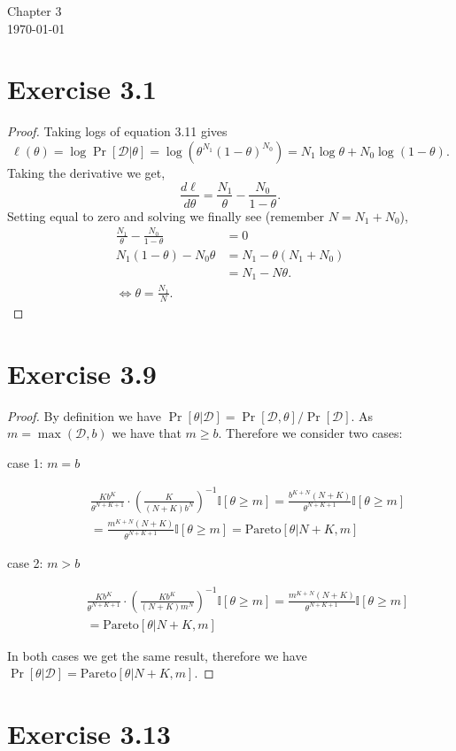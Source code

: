 \documentclass[12pt]{article}
\newcommand{\I}{\mathbb{I}}
\newcommand{\D}{\mathcal{D}}
\begin{document}
\begin{center}
{\Large Chapter 3}\\
\today
\end{center}
\section*{Exercise 3.1}
\begin{proof}
Taking logs of equation 3.11 gives
\[\ell(\theta) = \log \Pr[\D|\theta] = \log\left(\theta^{N_1}(1 - \theta)^{N_0} \right) = N_1 \log \theta + N_0 \log (1 - \theta).\] 
Taking the derivative we get,
\[\frac{d \ell}{d \theta} = \frac{N_1}{\theta} - \frac{N_0}{1 - \theta}.\]
Setting equal to zero and solving we finally see (remember $N = N_1 + N_0$),
\begin{align*}
    \frac{N_1}{\theta} - \frac{N_0}{1 - \theta} &= 0\\
    N_1 (1 - \theta) - N_0 \theta &= N_1 - \theta(N_1 + N_0)\\
    &= N_1 - N\theta.\\
    \iff \theta = \frac{N_1}{N}.
\end{align*}
\end{proof}
\section*{Exercise 3.9}
\begin{proof}
By definition we have $\Pr[\theta | \D]  = \Pr[\D, \theta] / \Pr[\D]$.
As $m = \max (\D, b)$ we have that $m \geq b$. Therefore we consider two cases:
\begin{description}
    \item[case 1: $m = b$]
        \begin{align*}
            \frac{Kb^K}{\theta^{N + K + 1}} \cdot \left(\frac{K}{(N + K)b^N}\right)^{-1} \I[\theta \geq m]
            = \frac{b^{K + N}(N+K)}{\theta^{N + K + 1}} \I[\theta \geq m]\\
            = \frac{m^{K + N}(N+K)}{\theta^{N + K + 1}} \I[\theta \geq m]
            = \text{Pareto}[\theta | N + K, m]
        \end{align*}
    \item[case 2: $m > b$]
        \begin{align*}
            \frac{Kb^K}{\theta^{N + K + 1}} \cdot \left(\frac{Kb^K}{(N + K)m^N}\right)^{-1} \I[\theta \geq m]
            = \frac{m^{K + N}(N+K)}{\theta^{N + K + 1}} \I[\theta \geq m]\\
            = \text{Pareto}[\theta | N + K, m]
        \end{align*}
\end{description}
In both cases we get the same result, therefore we have
$\Pr[\theta|\D] = \text{Pareto}[\theta| N + K, m]$.  \end{proof}
\section*{Exercise 3.13}
\end{document}
